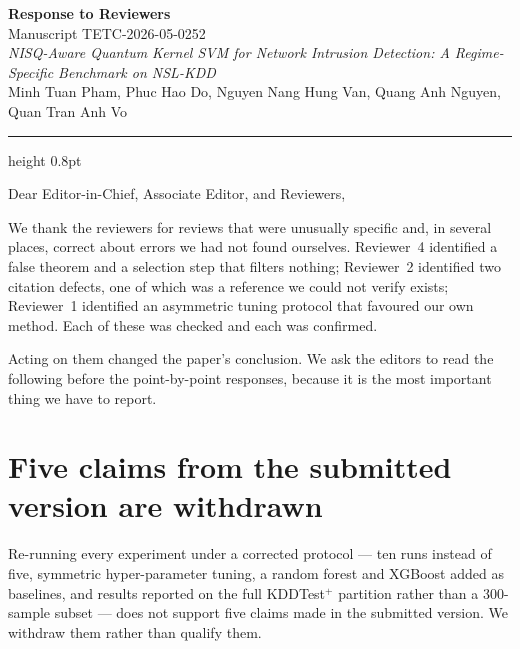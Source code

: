\documentclass[11pt,a4paper]{article}
\begin{document}
\begin{center}
  {\Large\bfseries Response to Reviewers}\\[4pt]
  {\normalsize Manuscript TETC-2026-05-0252}\\[2pt]
  {\normalsize\itshape NISQ-Aware Quantum Kernel SVM for Network Intrusion
   Detection: A Regime-Specific Benchmark on NSL-KDD}\\[6pt]
  {\normalsize Minh Tuan Pham, Phuc Hao Do, Nguyen Nang Hung Van,
   Quang Anh Nguyen, Quan Tran Anh Vo}
\end{center}

\vspace{6pt}
{\color{rulegray}\hrule height 0.8pt}
\vspace{10pt}

Dear Editor-in-Chief, Associate Editor, and Reviewers,

We thank the reviewers for reviews that were unusually specific and, in several
places, correct about errors we had not found ourselves. Reviewer~4 identified a
false theorem and a selection step that filters nothing; Reviewer~2 identified
two citation defects, one of which was a reference we could not verify exists;
Reviewer~1 identified an asymmetric tuning protocol that favoured our own
method. Each of these was checked and each was confirmed.

Acting on them changed the paper's conclusion. We ask the editors to read the
following before the point-by-point responses, because it is the most important
thing we have to report.

\section*{Five claims from the submitted version are withdrawn}

Re-running every experiment under a corrected protocol --- ten runs instead of
five, symmetric hyper-parameter tuning, a random forest and XGBoost added as
baselines, and results reported on the full KDDTest$^{+}$ partition rather than
a 300-sample subset --- does not support five claims made in the submitted
version. We withdraw them rather than qualify them.
\end{document}
